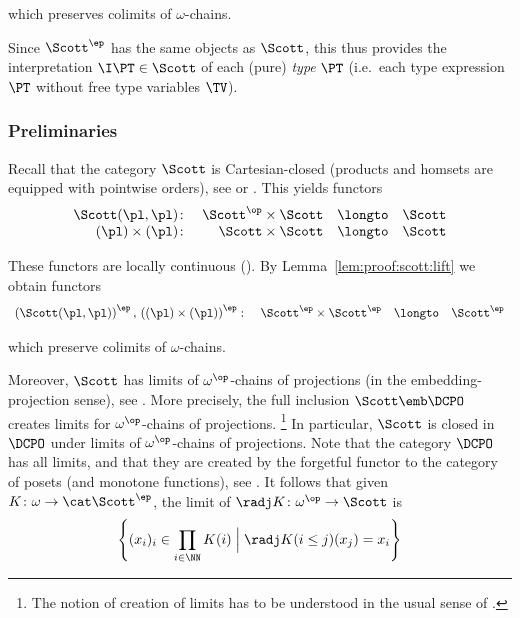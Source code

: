 \noindent
which preserves colimits of $\omega$-chains.

Since $\Scott^\ep$ has the same objects as $\Scott$,
this thus provides the interpretation $\I\PT \in \Scott$
of each (pure) \emph{type} $\PT$
(i.e.\ each type expression $\PT$ without free type variables $\TV$).


\subsubsection{Preliminaries}
Recall that the category $\Scott$ is Cartesian-closed
(products and homsets are equipped with pointwise orders),
see \cite[Corollary 4.1.6]{aj95chapter} or \cite[\S 1.4]{ac98book}.
This yields functors
\[
\begin{array}{r r c l}
  \Scott(\pl,\pl) \colon
& \Scott^\op \times \Scott
& \longto
& \Scott
\\
%
  (\pl) \times (\pl) \colon
& \Scott \times \Scott
& \longto
& \Scott
\end{array}
\]

\noindent
These functors are locally continuous
(\cite[Example 7.1.16]{ac98book}).
By Lemma~\ref{lem:proof:scott:lift}
we obtain functors
\[
\begin{array}{*{4}{l}}
  \left(\Scott(\pl,\pl) \right)^\ep
  ,\,
  \left( (\pl) \times (\pl) \right)^\ep
  \colon
& \Scott^\ep \times \Scott^\ep
& \longto
& \Scott^\ep
\end{array}
\]

\noindent
which preserve colimits of $\omega$-chains.

Moreover, $\Scott$ has limits of $\omega^\op$-chains
of projections (in the embedding-projection sense),
see \cite[Theorem 3.3.7, Theorem 3.3.11 and Proposition 4.1.3]{aj95chapter}.
%
More precisely, the full inclusion $\Scott \emb \DCPO$
creates limits for $\omega^\op$-chains of projections.%
\footnote{The notion of creation of limits has to be understood in the usual
sense of \cite[Definition V.1]{maclane98book}.}
%
In particular, $\Scott$
is closed in $\DCPO$ under limits of $\omega^\op$-chains of projections.
%
Note that the category $\DCPO$ has all limits,
and that they are created by the forgetful functor to the category
of posets (and monotone functions),
see \cite[Theorem 3.3.1]{aj95chapter}.
%
It follows that given $K \colon \omega \to \cat \Scott^\ep$,
the limit of $\radj K \colon \omega^\op \to \Scott$
is
\[
  \left\{
  (x_i)_i \in \prod_{i \in \NN} K(i)
  \mathrel{\Big|}
  \radj K(i \leq j)(x_j) = x_i
  \right\}
\]

